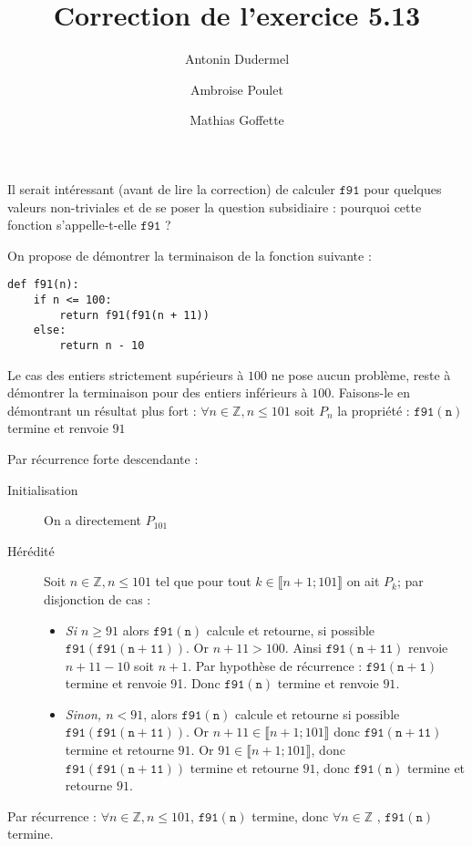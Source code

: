 \documentclass[11pt,a4paper]{article}
\title{Correction de l'exercice 5.13}
\date{}
\author{Antonin Dudermel \and Ambroise Poulet \and Mathias Goffette}
\begin{document}

\maketitle

\begin{it}
Il serait intéressant (avant de lire la correction) de calculer \;$\mathtt{f91}$ pour quelques valeurs non-triviales et de se poser la question subsidiaire : pourquoi cette fonction s'appelle-t-elle \;$\mathtt{f91}$ ?
\end{it}
\par
On propose de démontrer la terminaison de la fonction suivante :

\begin{lstlisting}
def f91(n):
    if n <= 100:
        return f91(f91(n + 11))
    else:
        return n - 10
\end{lstlisting}

\par
Le cas des entiers strictement supérieurs à $100$ ne pose aucun problème, reste à démontrer la terminaison pour des entiers inférieurs à $100$.
Faisons-le en démontrant un résultat plus fort : $\forall n \in \mathbb{Z}, n\leq 101$ soit $P_n$ la propriété : \og{} $\mathtt{f91(n)}$ termine et renvoie $91$ \fg{}
\par
Par récurrence forte descendante :\\
\begin{description}
\item[Initialisation] \quad On a directement $P_{101}$
\item[Hérédité] \quad Soit $n\in \mathbb{Z}, n \leq 101$ tel que pour tout $ k \in \llbracket n+1;101\rrbracket$ on ait $P_{k}$; par disjonction de cas : 
\begin{itemize}[\textbullet]
	\item {\itshape Si $n\geqslant 91$ } alors $\mathtt{f91(n)}$ calcule et retourne, si possible $\mathtt{f91(f91(n+11))}$. Or $n+11 > 100$. Ainsi $\mathtt{f91(n+11)}$ renvoie $n+11-10$ soit $n+1$. Par hypothèse de récurrence : $\mathtt{f91(n+1)}$ termine et renvoie 91. Donc $\mathtt{f91(n)}$ termine et renvoie $91$.
	\item {\itshape Sinon, $n < 91$}, alors $\mathtt{f91(n)}$ calcule et retourne si possible $\mathtt{f91(f91(n+11))}$. Or $n+11\in \llbracket n+1;101 \rrbracket$ donc $\mathtt{f91(n+11)}$ termine et retourne $91$. Or $91 \in \llbracket n+1;101 \rrbracket$, donc $\mathtt{f91(f91(n+11))}$ termine et retourne $91$, donc $\mathtt{f91(n)}$ termine et retourne $91$.
\end{itemize}
\end{description}
Par récurrence : $\forall n \in \mathbb{Z}, n \leq 101$, $\mathtt{f91(n)}$ termine,
donc $\forall n \in \mathbb{Z}$ , $\mathtt{f91(n)}$ termine.
\end{document}
